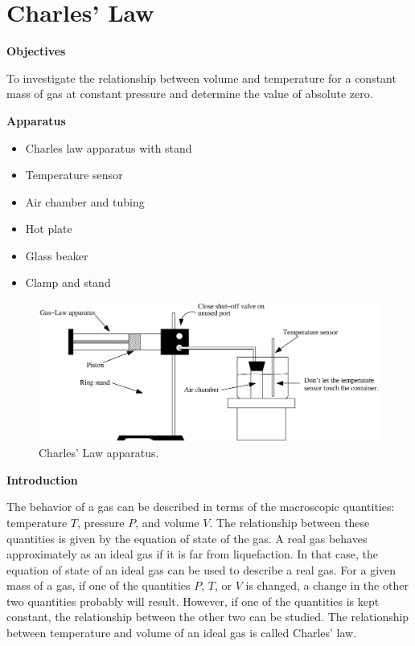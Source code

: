 
\section{Charles' Law}

\makelabheader %

\textbf{Objectives} 

To investigate the relationship between volume and temperature for
a constant mass of gas at constant pressure and determine the value
of absolute zero.

\textbf{Apparatus} 

\begin{itemize}
\item Charles law apparatus with stand
\item Temperature sensor
\item Air chamber and tubing
\item Hot plate
\item Glass beaker
\item Clamp and stand
\end{itemize}
\vspace{0.3cm}

\begin{figure}[hbt]
\begin{center}
\includegraphics[width=6.0in]{charles_law/charles_law_fig1.eps}
\caption{Charles' Law apparatus.}
\end{center}
\end{figure}

\textbf{Introduction}

The behavior of a gas can be described in terms of the macroscopic quantities:
temperature $T$, pressure $P$, and volume $V$. The relationship between these
quantities is given by the equation of state of the gas. A real gas behaves
approximately as an ideal gas if it is far from liquefaction. In that case,
the equation of state of an ideal gas can be used to describe a real gas. For
a given mass of a gas, if one of the quantities $P$, $T$, or $V$ is changed, a change
in the other two quantities probably will result. However, if one of the quantities
is kept constant, the relationship between the other two can be studied. The
relationship between temperature and volume of an ideal gas is called Charles' law.

